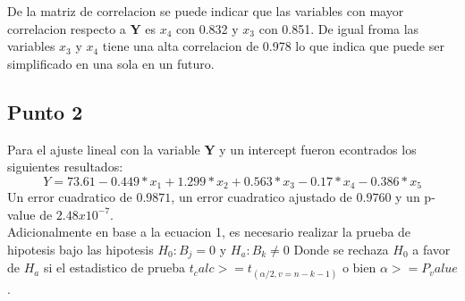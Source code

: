 \documentclass[a4paper]{article}
\begin{document}
De la matriz de correlacion se puede indicar que las variables con mayor correlacion respecto a \textbf{Y}  es \textbf{$x_4$} con 0.832 y \textbf{$x_3$} con 0.851. De igual froma las variables \textbf{$x_3$} y \textbf{$x_4$} tiene una alta correlacion de 0.978 lo que indica que puede ser simplificado en una sola en un futuro.


\subsection{Punto 2}
Para el ajuste lineal con la variable \textbf{Y} y un intercept fueron econtrados los siguientes resultados:\\
\begin{equation}
    Y=73.61-0.449*x_1+1.299*x_2+0.563*x_3-0.17*x_4-0.386*x_5
    \label{modelo1}
\end{equation}
Un error cuadratico de $0.9871$, un error cuadratico ajustado de $0.9760$ y un p-value de $2.48x10^{-7}$.\\
Adicionalmente en base a la ecuacion 1, es necesario realizar la prueba de hipotesis bajo las hipotesis $H_0 : B_j=0$ y
$H_a : B_k \neq 0$ Donde se rechaza $H_0$ a favor de $H_a$ si el estadistico de prueba $t_calc >=t_(\alpha/2 ,v = n-k-1)$ o bien $\alpha >= P_value$.\\ 
\end{document}
